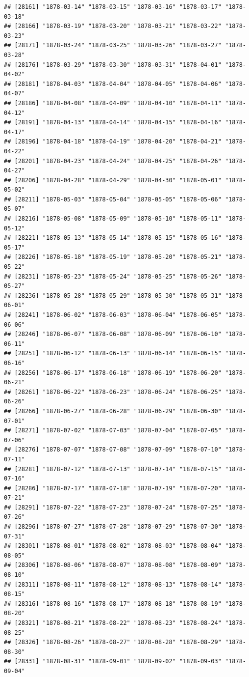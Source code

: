 \documentclass{article}\usepackage[]{graphicx}\usepackage[]{color}
\makeatletter
\newenvironment{kframe}{%
 \def\at@end@of@kframe{}%
 \ifinner\ifhmode%
  \def\at@end@of@kframe{\end{minipage}}%
  \begin{minipage}{\columnwidth}%
 \fi\fi%
 \def\FrameCommand##1{\hskip\@totalleftmargin \hskip-\fboxsep
 \colorbox{shadecolor}{##1}\hskip-\fboxsep
     \hskip-\linewidth \hskip-\@totalleftmargin \hskip\columnwidth}%
 \MakeFramed {\advance\hsize-\width
   \@totalleftmargin\z@ \linewidth\hsize
   \@setminipage}}%
 {\par\unskip\endMakeFramed%
 \at@end@of@kframe}
\newenvironment{knitrout}{}{} %
\makeatother
\begin{document}
\begin{description}
\begin{knitrout}
\begin{kframe}
\begin{verbatim}
## [28161] "1878-03-14" "1878-03-15" "1878-03-16" "1878-03-17" "1878-03-18"
## [28166] "1878-03-19" "1878-03-20" "1878-03-21" "1878-03-22" "1878-03-23"
## [28171] "1878-03-24" "1878-03-25" "1878-03-26" "1878-03-27" "1878-03-28"
## [28176] "1878-03-29" "1878-03-30" "1878-03-31" "1878-04-01" "1878-04-02"
## [28181] "1878-04-03" "1878-04-04" "1878-04-05" "1878-04-06" "1878-04-07"
## [28186] "1878-04-08" "1878-04-09" "1878-04-10" "1878-04-11" "1878-04-12"
## [28191] "1878-04-13" "1878-04-14" "1878-04-15" "1878-04-16" "1878-04-17"
## [28196] "1878-04-18" "1878-04-19" "1878-04-20" "1878-04-21" "1878-04-22"
## [28201] "1878-04-23" "1878-04-24" "1878-04-25" "1878-04-26" "1878-04-27"
## [28206] "1878-04-28" "1878-04-29" "1878-04-30" "1878-05-01" "1878-05-02"
## [28211] "1878-05-03" "1878-05-04" "1878-05-05" "1878-05-06" "1878-05-07"
## [28216] "1878-05-08" "1878-05-09" "1878-05-10" "1878-05-11" "1878-05-12"
## [28221] "1878-05-13" "1878-05-14" "1878-05-15" "1878-05-16" "1878-05-17"
## [28226] "1878-05-18" "1878-05-19" "1878-05-20" "1878-05-21" "1878-05-22"
## [28231] "1878-05-23" "1878-05-24" "1878-05-25" "1878-05-26" "1878-05-27"
## [28236] "1878-05-28" "1878-05-29" "1878-05-30" "1878-05-31" "1878-06-01"
## [28241] "1878-06-02" "1878-06-03" "1878-06-04" "1878-06-05" "1878-06-06"
## [28246] "1878-06-07" "1878-06-08" "1878-06-09" "1878-06-10" "1878-06-11"
## [28251] "1878-06-12" "1878-06-13" "1878-06-14" "1878-06-15" "1878-06-16"
## [28256] "1878-06-17" "1878-06-18" "1878-06-19" "1878-06-20" "1878-06-21"
## [28261] "1878-06-22" "1878-06-23" "1878-06-24" "1878-06-25" "1878-06-26"
## [28266] "1878-06-27" "1878-06-28" "1878-06-29" "1878-06-30" "1878-07-01"
## [28271] "1878-07-02" "1878-07-03" "1878-07-04" "1878-07-05" "1878-07-06"
## [28276] "1878-07-07" "1878-07-08" "1878-07-09" "1878-07-10" "1878-07-11"
## [28281] "1878-07-12" "1878-07-13" "1878-07-14" "1878-07-15" "1878-07-16"
## [28286] "1878-07-17" "1878-07-18" "1878-07-19" "1878-07-20" "1878-07-21"
## [28291] "1878-07-22" "1878-07-23" "1878-07-24" "1878-07-25" "1878-07-26"
## [28296] "1878-07-27" "1878-07-28" "1878-07-29" "1878-07-30" "1878-07-31"
## [28301] "1878-08-01" "1878-08-02" "1878-08-03" "1878-08-04" "1878-08-05"
## [28306] "1878-08-06" "1878-08-07" "1878-08-08" "1878-08-09" "1878-08-10"
## [28311] "1878-08-11" "1878-08-12" "1878-08-13" "1878-08-14" "1878-08-15"
## [28316] "1878-08-16" "1878-08-17" "1878-08-18" "1878-08-19" "1878-08-20"
## [28321] "1878-08-21" "1878-08-22" "1878-08-23" "1878-08-24" "1878-08-25"
## [28326] "1878-08-26" "1878-08-27" "1878-08-28" "1878-08-29" "1878-08-30"
## [28331] "1878-08-31" "1878-09-01" "1878-09-02" "1878-09-03" "1878-09-04"

\end{verbatim}
\end{kframe}
\end{knitrout}
\end{description}
\end{document}
